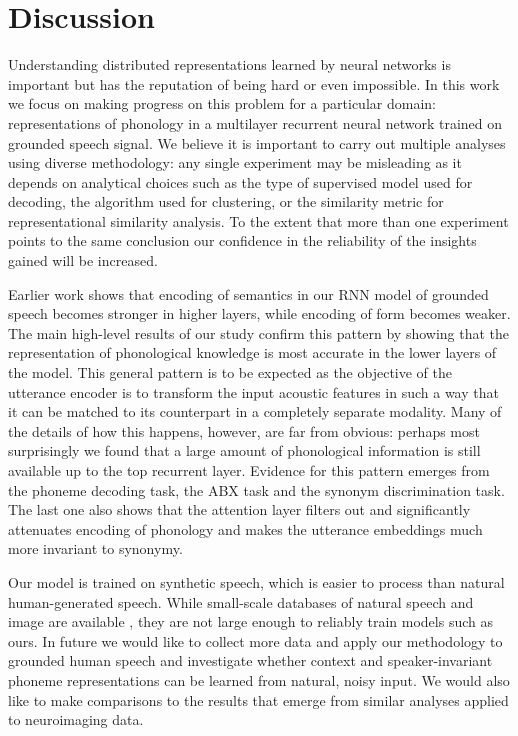 \section{Discussion}
\label{sec:conclusion}
Understanding distributed representations learned by neural networks
is important but has the reputation of being hard or even impossible. In
this work we focus on making progress on this problem for a particular
domain: representations of phonology in a multilayer recurrent neural network
trained on grounded speech signal. We believe it is important to
carry out multiple analyses using diverse methodology: any single
experiment may be misleading as it depends on analytical choices such
as the type of supervised model used for decoding, the algorithm used
for clustering, or the similarity metric for representational
similarity analysis. To the extent that more than one experiment
points to the same conclusion our confidence in the reliability of the
insights gained will be increased.

Earlier work \cite{chrupala2017representations} 
shows that encoding of semantics in our RNN model of grounded speech 
becomes stronger in higher layers, while encoding of form becomes weaker.
The main high-level results of our study confirm this pattern by showing that 
the representation of phonological knowledge is most accurate in the lower
layers of the model. This general pattern is to be expected as the
objective of the utterance encoder is to transform the input acoustic
features in such a way that it can be matched to its counterpart in a
completely separate modality. Many of the details of how this happens,
however, are far from obvious: perhaps most surprisingly we found that
a large amount of phonological information is still available up to the top
recurrent layer. Evidence for this pattern emerges from the phoneme
decoding task, the ABX task and the synonym discrimination task. The
last one also shows that the attention layer filters out and
significantly attenuates encoding of phonology and makes the utterance
embeddings much more invariant to synonymy.

Our model is trained on synthetic speech, which is easier to process than 
natural human-generated speech. While small-scale databases of natural 
speech and image are available \citep[e.g.\ the Flickr8k Audio Caption
Corpus,][]{harwath2015deep}, they are not large enough to reliably
train models such as ours. 
In future we would like to collect more data and apply our methodology to grounded 
human speech and investigate whether context and speaker-invariant phoneme 
representations can be learned from natural, noisy input. We would also like to make
comparisons to the results that emerge from similar analyses
applied to neuroimaging data.
  